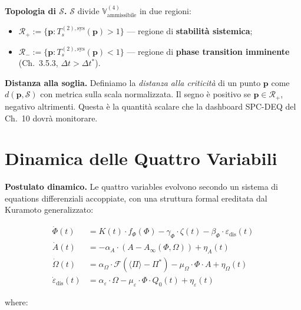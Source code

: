 \Hypoth{} \textbf{Topologia di \(\mathcal{S}\).} \(\mathcal{S}\) divide
\(\mathbb{V}^{(4)}_{\text{ammissibile}}\) in due regioni:

\begin{itemize}
\tightlist
\item
  \(\mathcal{R}_+ := \{\boldsymbol{p} : T_s^{(2),\text{sys}}(\boldsymbol{p}) > 1\}\)
  --- regione di \textbf{stabilità sistemica};
\item
  \(\mathcal{R}_- := \{\boldsymbol{p} : T_s^{(2),\text{sys}}(\boldsymbol{p}) < 1\}\)
  --- regione di \textbf{phase transition imminente} (Ch.~3.5.3,
  \(\Delta t > \Delta t^*\)).
\end{itemize}

\Hypoth{} \textbf{Distanza alla soglia.} Definiamo la \emph{distanza
alla criticità} di un punto \(\boldsymbol{p}\) come
\(d(\boldsymbol{p}, \mathcal{S})\) con metrica sulla scala normalizzata.
Il segno è positivo se \(\boldsymbol{p} \in \mathcal{R}_+\), negativo
altrimenti. Questa è la quantità scalare che la dashboard SPC-DEQ del
Ch.~10 dovrà monitorare.



\section{Dinamica delle Quattro
Variabili}\label{dinamica-delle-quattro-variables}

\Hypoth{} \textbf{Postulato dinamico.} Le quattro variables evolvono
secondo un sistema di equations differenziali accoppiate, con una
struttura formal ereditata dal Kuramoto generalizzato:

\[
\begin{aligned}
\dot{\Phi}(t) &= K(t) \cdot f_\Phi(\Phi) - \gamma_\Phi \cdot \zeta(t) - \beta_\Phi \cdot \varepsilon_{\text{dis}}(t) \\
\dot{A}(t) &= -\alpha_A \cdot (A - A_\infty(\Phi, \Omega)) + \eta_A(t) \\
\dot{\Omega}(t) &= \alpha_\Omega \cdot \mathcal{F}(\langle\Pi\rangle - \Pi^*) - \mu_\Omega \cdot \Phi \cdot A + \eta_\Omega(t) \\
\dot{\varepsilon}_{\text{dis}}(t) &= \alpha_\varepsilon \cdot \Omega - \mu_\varepsilon \cdot \Phi \cdot Q_0(t) + \eta_\varepsilon(t)
\end{aligned}
\]

where:

